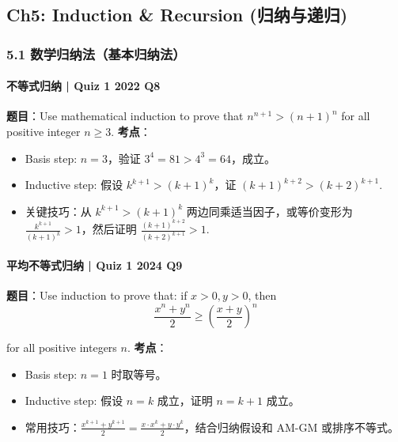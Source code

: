 \documentclass[10pt,a4paper,openany]{ctexbook}
\theoremstyle{definition}
\theoremstyle{remark}
\begin{document}
\vspace{-2pt}

\subsection{Ch5: Induction \& Recursion (归纳与递归)}

\subsubsection{5.1 数学归纳法（基本归纳法）}

\paragraph{不等式归纳 | Quiz 1 2022 Q8}

\textbf{题目}：Use mathematical induction to prove that $n^{n+1} > (n+1)^n$ for all positive integer $n \ge 3$.
\textbf{考点}：
\begin{itemize}
\item Basis step: $n=3$，验证 $3^4 = 81 > 4^3 = 64$，成立。
\item Inductive step: 假设 $k^{k+1} > (k+1)^k$，证 $(k+1)^{k+2} > (k+2)^{k+1}$.
\item 关键技巧：从 $k^{k+1} > (k+1)^k$ 两边同乘适当因子，或等价变形为 $\frac{k^{k+1}}{(k+1)^k} > 1$，然后证明 $\frac{(k+1)^{k+2}}{(k+2)^{k+1}} > 1$.

\end{itemize}

\vspace{-2pt}

\paragraph{平均不等式归纳 | Quiz 1 2024 Q9}

\textbf{题目}：Use induction to prove that: if $x > 0, y > 0$, then
\[
\frac{x^n + y^n}{2} \ge \left(\frac{x+y}{2}\right)^n
\]

for all positive integers $n$.
\textbf{考点}：
\begin{itemize}
\item Basis step: $n=1$ 时取等号。
\item Inductive step: 假设 $n=k$ 成立，证明 $n=k+1$ 成立。
\item 常用技巧：$\frac{x^{k+1}+y^{k+1}}{2} = \frac{x\cdot x^k + y \cdot y^k}{2}$，结合归纳假设和 AM-GM 或排序不等式。

\end{itemize}
\end{document}
